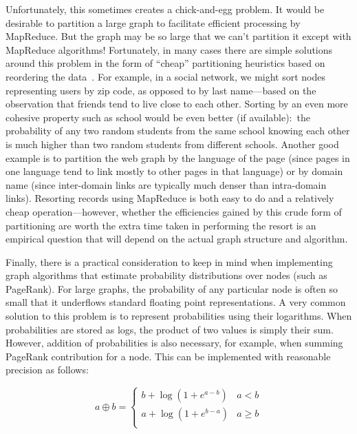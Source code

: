 Unfortunately, this sometimes creates a chick-and-egg problem.  It
would be desirable to partition a large graph to facilitate efficient
processing by MapReduce.  But the graph may be so large that we can't
partition it except with MapReduce algorithms!  Fortunately, in many
cases there are simple solutions around this problem in the form of
``cheap'' partitioning heuristics based on reordering the
data~\cite{Mellor-Crummey_etal_2001}.  For example, in a social
network, we might sort nodes representing users by zip code, as
opposed to by last name---based on the observation that friends tend
to live close to each other.  Sorting by an even more cohesive
property such as school would be even better (if available):\ the
probability of any two random students from the same school knowing
each other is much higher than two random students from different
schools.  Another good example is to partition the web graph by the
language of the page (since pages in one language tend to link mostly
to other pages in that language) or by domain name (since inter-domain
links are typically much denser than intra-domain links).  Resorting
records using MapReduce is both easy to do and a relatively cheap operation---however,
whether the efficiencies gained by this crude form of partitioning are
worth the extra time taken in performing the resort is an empirical
question that will depend on the actual graph structure and algorithm.

Finally, there is a practical consideration to keep in mind when
implementing graph algorithms that estimate probability distributions
over nodes (such as PageRank).  For large graphs, the probability of
any particular node is often so small that it underflows standard
floating point representations.  A very common solution to this
problem is to represent probabilities using their logarithms.  When
probabilities are stored as logs, the product of two values is simply
their sum.  However, addition of probabilities is also necessary, for
example, when summing PageRank contribution for a node.  This can be
implemented with reasonable precision as follows:

\begin{displaymath}
 a \oplus b = \left\{
 \begin{array}{ll}
 b + \log  (1 + e^{a - b} ) & a < b \\
 a + \log  (1 + e^{b - a} ) & a \ge b \\
 \end{array} \right.
 \end{displaymath}

